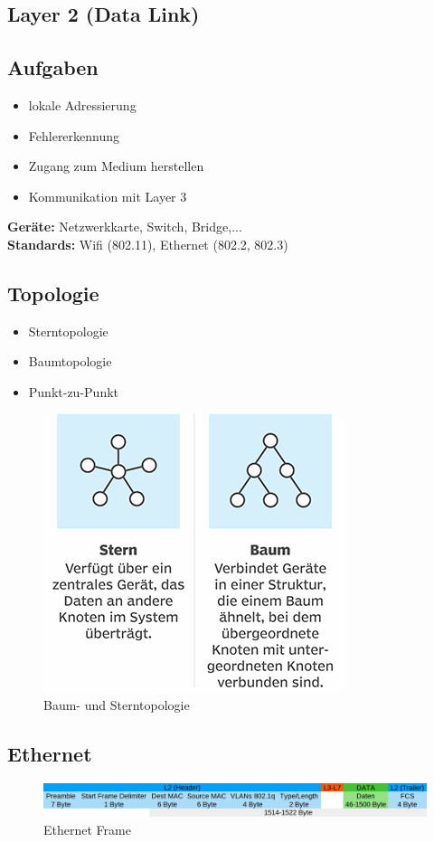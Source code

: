\subsection{Layer 2 (Data Link)}
\subsection*{Aufgaben}
\begin{itemize}
	\item lokale Adressierung
	\item Fehlererkennung
	\item Zugang zum Medium herstellen
	\item Kommunikation mit Layer 3
\end{itemize}

\textbf{Geräte:} Netzwerkkarte, Switch, Bridge,... \\
\textbf{Standards:} Wifi (802.11), Ethernet (802.2, 802.3)
\subsection*{Topologie}
\begin{itemize}
	\item Sterntopologie
	\item Baumtopologie
	\item Punkt-zu-Punkt
\end{itemize}
\begin{figure}[H]
	\centering
	\includegraphics[width=0.6\linewidth]{figures/topologiearten.png}
	\caption{Baum- und Sterntopologie}
\end{figure}

\subsection*{Ethernet}
\begin{figure}[H]
	\centering
	\includegraphics[width=1.0\linewidth]{figures/ethheader.png}
	\caption{Ethernet Frame}
\end{figure}

